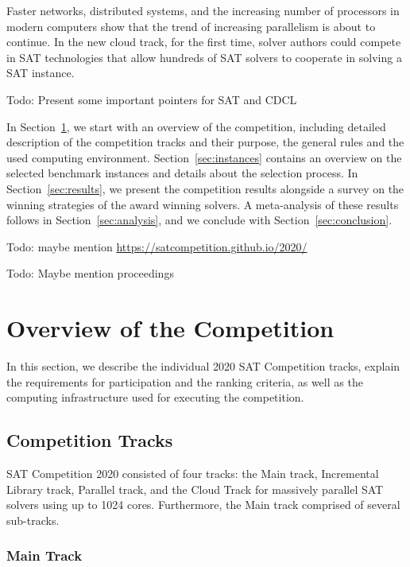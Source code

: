 \documentclass{elsarticle}
\newcommand{\todo}[1]{{\color{purple}Todo: #1}}
\begin{document}
Faster networks, distributed systems, and the increasing number of processors in modern computers show that the trend of increasing parallelism is about to continue.  
In the new cloud track, for the first time, solver authors could compete in SAT technologies that allow hundreds of SAT solvers to cooperate in solving a SAT instance. 

\todo{Present some important pointers for SAT and CDCL}

In Section~\ref{sec:overview}, we start with an overview of the competition,
including detailed description of the competition tracks and their purpose,
the general rules and the used computing environment.
Section~\ref{sec:instances} contains an overview on the selected benchmark instances and details about the selection process. 
In Section~\ref{sec:results}, we present the competition results alongside a survey on the winning strategies of the award winning solvers. 
A meta-analysis of these results follows in Section~\ref{sec:analysis}, and we conclude with Section~\ref{sec:conclusion}.

\todo{maybe mention \url{https://satcompetition.github.io/2020/}}

\todo{Maybe mention proceedings \cite{SC2020}}

\section{Overview of the Competition}
\label{sec:overview}

In this section, we describe the individual 2020 SAT Competition tracks,
explain the requirements for participation %
and the ranking criteria, as well as
the computing infrastructure used for executing the competition.

\subsection{Competition Tracks}

SAT Competition 2020 consisted of four tracks:
the Main track, Incremental Library track, Parallel track,
and the Cloud Track for massively parallel SAT solvers using up to 1024 cores. 
Furthermore, the Main track comprised of several sub-tracks.

\subsubsection{Main Track}
\end{document}
